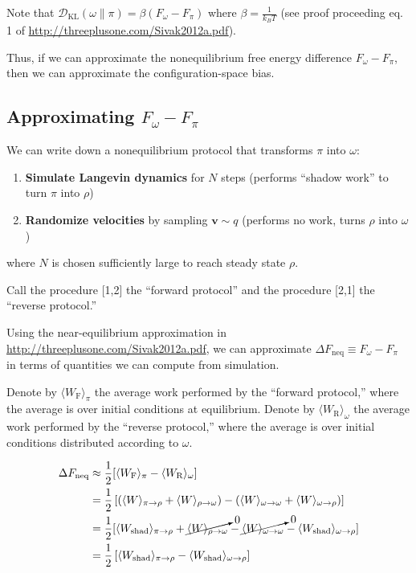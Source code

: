 \documentclass[11pt]{article}
\newcommand{\vel}{\mathbf{v}}
\newcommand{\kldiv}{\mathcal{D}_\text{KL}}
\begin{document}

Note that $\kldiv(\omega \| \pi) = \beta (F_\omega - F_\pi)$ where $\beta = \frac{1}{k_B T}$ (see proof proceeding eq. 1 of \url{http://threeplusone.com/Sivak2012a.pdf}).

Thus, if we can approximate the nonequilibrium free energy difference $F_\omega - F_\pi$, then we can approximate the configuration-space bias.

\subsection*{Approximating $F_\omega - F_\pi$}
We can write down a nonequilibrium protocol that transforms $\pi$ into $\omega$:
\begin{enumerate}
\item \textbf{Simulate Langevin dynamics} for $N$ steps (performs ``shadow work'' to turn $\pi$ into $\rho$)
\item \textbf{Randomize velocities} by sampling $\vel \sim q$ (performs no work, turns $\rho$ into $\omega$)
\end{enumerate}
where $N$ is chosen sufficiently large to reach steady state $\rho$.

Call the procedure [1,2] the ``forward protocol'' and the procedure [2,1] the ``reverse protocol.''

Using the near-equilibrium approximation in \url{http://threeplusone.com/Sivak2012a.pdf}, we can approximate $\Delta F_\text{neq} \equiv F_\omega - F_\pi$  in terms of quantities we can compute from simulation.

Denote by $\langle W_\text{F} \rangle_\pi$ the average work performed by the ``forward protocol,'' where the average is over initial conditions at equilibrium. Denote by $\langle W_\text{R} \rangle_\omega$ the average work performed by the ``reverse protocol,'' where the average is over initial conditions distributed according to $\omega$.

$$\begin{aligned}
\Delta F_\text{neq}
& \approx
\frac{1}{2} [ \langle W_\text{F} \rangle_\pi - \langle W_\text{R} \rangle_\omega ]\\
&= \frac{1}{2}
\left[
\left(
\langle W \rangle_{\pi \to \rho}
+ \langle W \rangle_{\rho \to \omega}
\right)
- \left(
\langle W \rangle_{\omega \to \omega} + 
\langle W \rangle_{\omega \to \rho}
\right)
\right]\\
&= \frac{1}{2} [
\langle W_\text{shad} \rangle_{\pi \to \rho}
+ \cancelto{0}{\langle W \rangle_{\rho \to \omega}}
- 
\cancelto{0}{\langle W \rangle_{\omega \to \omega}} 
- 
\langle W_\text{shad} \rangle_{\omega \to \rho} ]\\
&= \frac{1}{2} \left[
\langle W_\text{shad} \rangle_{\pi \to \rho}
- \langle W_\text{shad} \rangle_{\omega \to \rho} \right]\\
\end{aligned}$$
\end{document}
